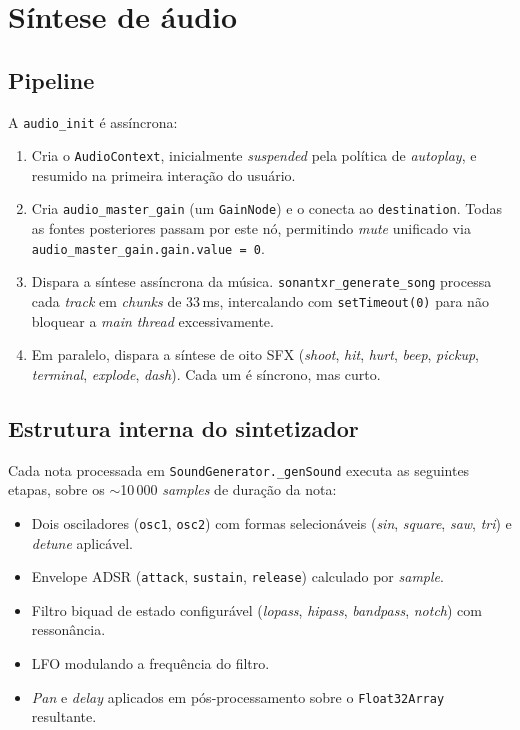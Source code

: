 \section{Síntese de áudio}


\subsection{Pipeline}

A \texttt{audio\_init} é assíncrona:

\begin{enumerate}
  \item Cria o \texttt{AudioContext}, inicialmente \emph{suspended} pela política de
    \emph{autoplay}, e resumido na primeira interação do usuário.
  \item Cria \texttt{audio\_master\_gain} (um \texttt{GainNode}) e o conecta ao
    \texttt{destination}. Todas as fontes posteriores passam por este nó,
    permitindo \emph{mute} unificado via
    \texttt{audio\_master\_gain.gain.value = 0}.
  \item Dispara a síntese assíncrona da música. \texttt{sonantxr\_generate\_song}
    processa cada \emph{track} em \emph{chunks} de 33\,ms, intercalando com
    \texttt{setTimeout(0)} para não bloquear a \emph{main thread} excessivamente.
  \item Em paralelo, dispara a síntese de oito SFX (\emph{shoot}, \emph{hit},
    \emph{hurt}, \emph{beep}, \emph{pickup}, \emph{terminal}, \emph{explode},
    \emph{dash}). Cada um é síncrono, mas curto.
\end{enumerate}

\subsection{Estrutura interna do sintetizador}

Cada nota processada em \texttt{SoundGenerator.\_genSound} executa as seguintes
etapas, sobre os $\sim$10\,000 \emph{samples} de duração da nota:

\begin{itemize}
  \item Dois osciladores (\texttt{osc1}, \texttt{osc2}) com formas selecionáveis
    (\textit{sin}, \textit{square}, \textit{saw}, \textit{tri}) e \emph{detune}
    aplicável.
  \item Envelope ADSR (\texttt{attack}, \texttt{sustain}, \texttt{release})
    calculado por \emph{sample}.
  \item Filtro biquad de estado configurável (\textit{lopass}, \textit{hipass},
    \textit{bandpass}, \textit{notch}) com ressonância.
  \item LFO modulando a frequência do filtro.
  \item \emph{Pan} e \emph{delay} aplicados em pós-processamento sobre o
    \texttt{Float32Array} resultante.
\end{itemize}


